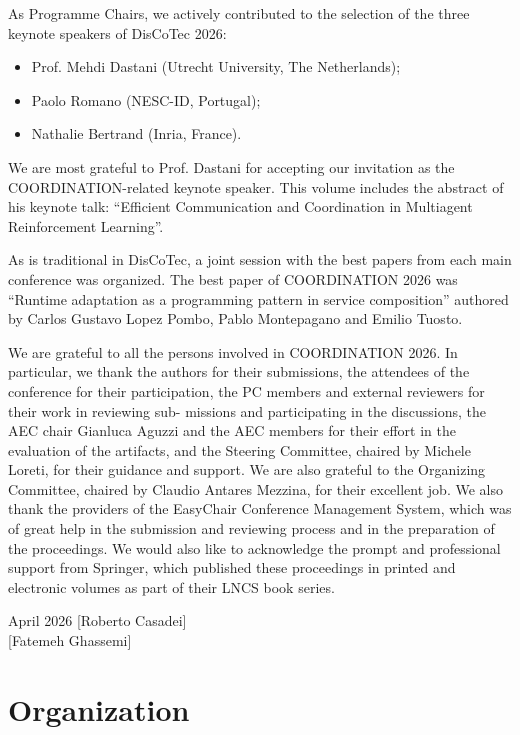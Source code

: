 \documentclass[runningheads]{llncs}
\begin{document}
As Programme Chairs, we actively contributed to the selection of the three keynote
speakers of DisCoTec 2026:\begin{itemize}
	\item Prof. Mehdi Dastani (Utrecht University, The Netherlands);
	\item Paolo Romano (NESC-ID, Portugal);
	\item Nathalie Bertrand (Inria, France).
\end{itemize}
We are most grateful to Prof. Dastani for accepting our invitation as the  COORDINATION-related keynote speaker. This volume includes the abstract of his keynote
talk: “Efficient Communication and Coordination in Multiagent Reinforcement Learning”.


As is traditional in DisCoTec, a joint session with the best papers from each main conference was organized. The best paper of COORDINATION 2026 was “Runtime adaptation as a programming pattern in service composition” authored by Carlos Gustavo Lopez Pombo, Pablo Montepagano and Emilio Tuosto. 


We are grateful to all the persons involved in COORDINATION 2026. In particular,
we thank the authors for their submissions, the attendees of the conference for their
participation, the PC members and external reviewers for their work in reviewing sub-
missions and participating in the discussions, the AEC chair Gianluca Aguzzi and
the AEC members for their effort in the evaluation of the artifacts, and the Steering Committee,
chaired by Michele Loreti, for their guidance and support. We are also grateful to the
Organizing Committee, chaired by Claudio Antares Mezzina, for their excellent job. We also thank
the providers of the EasyChair Conference Management System, which was of great
help in the submission and reviewing process and in the preparation of the proceedings.
We would also like to acknowledge the prompt and professional support from Springer,
which published these proceedings in printed and electronic volumes as part of their
LNCS book series.
\medskip

\begin{flushright}
\noindent April 2026\hfill
{[Roberto Casadei]}\\
{[Fatemeh Ghassemi]}
\end{flushright}


\chapter*{Organization}
\setlength{\tabcolsep}{0pt}     %
\setlength{\LTpre}{0pt}         %
\end{document}

